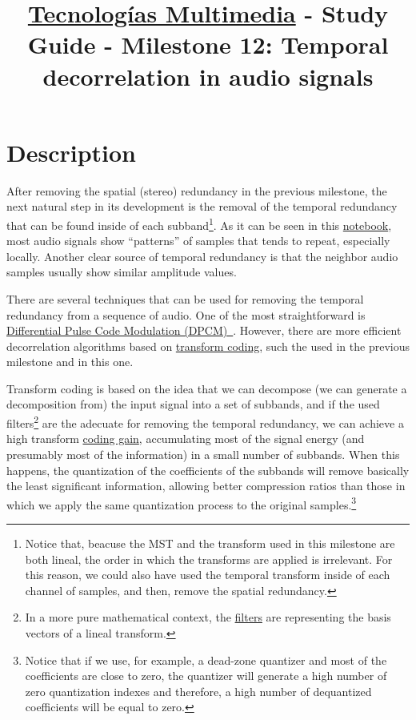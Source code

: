 \title{\href{https://www.ual.es/estudios/grados/presentacion/plandeestudios/asignatura/4015/40154321?idioma=zh_CN}{Tecnologías Multimedia} - Study Guide - Milestone 12: Temporal decorrelation in audio signals}

\maketitle

\section{Description}

After removing the spatial (stereo) redundancy in the previous
milestone, the next natural step in its development is the removal of
the temporal redundancy that can be found inside of each
subband\footnote{Notice that, beacuse the MST and the transform used
in this milestone are both lineal, the order in which the transforms
are applied is irrelevant. For this reason, we could also have used
the temporal transform inside of each channel of samples, and then,
remove the spatial redundancy.}. As it can be seen in this
\href{}{notebook}, most audio signals show ``patterns'' of samples
that tends to repeat, especially locally. Another clear source of
temporal redundancy is that the neighbor audio samples usually show
similar amplitude values.

There are several techniques that can be used for removing the
temporal redundancy from a sequence of audio. One of the most
straightforward is
\href{https://en.wikipedia.org/wiki/Differential_pulse-code_modulation}{Differential
  Pulse Code Modulation
  (DPCM)~\cite{sayood2017introduction}}. However, there are more
efficient decorrelation algorithms based on
\href{https://en.wikipedia.org/wiki/Transform_coding}{transform
  coding}, such the used in the previous milestone and in this one.

Transform coding is based on the idea that we can decompose (we can
generate a decomposition from) the input signal into a set of
subbands, and if the used filters\footnote{In a more pure mathematical
  context, the
  \href{https://en.wikipedia.org/wiki/Digital_filter}{filters} are
  representing the basis vectors of a lineal transform.} are the
adecuate for removing the temporal redundancy, we can achieve a high
transform \href{https://en.wikipedia.org/wiki/Coding_gain}{coding
  gain}, accumulating most of the signal energy (and presumably most
of the information) in a small number of subbands. When this happens,
the quantization of the coefficients of the subbands will remove
basically the least significant information, allowing better
compression ratios than those in which we apply the same quantization
process to the original samples.\footnote{Notice that if we use, for
  example, a dead-zone quantizer and most of the coefficients are
  close to zero, the quantizer will generate a high number of zero
  quantization indexes and therefore, a high number of dequantized
  coefficients will be equal to zero.}


